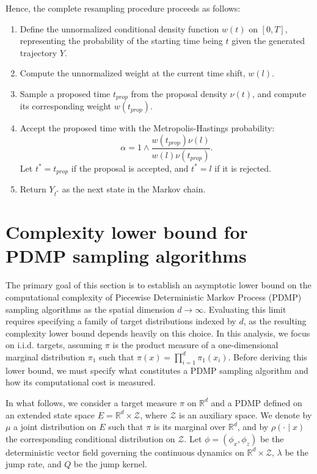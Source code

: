 \documentclass{article}
\begin{document}
Hence, the complete resampling procedure proceeds as follows:
\begin{enumerate}
    \item Define the unnormalized conditional density function $w(t)$ on $[0,T]$, representing the probability of the starting time being $t$ given the generated trajectory $Y$.
    \item Compute the unnormalized weight at the current time shift, $w(l)$.
    \item Sample a proposed time $t_{prop}$ from the proposal density $\nu(t)$, and compute its corresponding weight $w(t_{prop})$.
    \item Accept the proposed time with the Metropolis-Hastings probability:
    \begin{equation}
        \alpha = 1 \wedge \frac{w(t_{prop})\nu(l)}{w(l)\nu(t_{prop})}.
    \end{equation}
    Let $t^* = t_{prop}$ if the proposal is accepted, and $t^* = l$ if it is rejected.
    \item Return $Y_{t^*}$ as the next state in the Markov chain.
\end{enumerate}

\section{Complexity lower bound for PDMP sampling algorithms}
\label{sec:complexity_bound}
The primary goal of this section is to establish an asymptotic lower bound on the computational complexity of Piecewise Deterministic Markov Process (PDMP) sampling algorithms as the spatial dimension $d \rightarrow \infty$. Evaluating this limit requires specifying a family of target distributions indexed by $d$, as the resulting complexity lower bound depends heavily on this choice. In this analysis, we focus on i.i.d. targets, assuming $\pi$ is the product measure of a one-dimensional marginal distribution $\pi_1$ such that $\pi(x) = \prod_{i=1}^d \pi_1(x_i)$. Before deriving this lower bound, we must specify what constitutes a PDMP sampling algorithm and how its computational cost is measured.

In what follows, we consider a target measure $\pi$ on $\mathbb{R}^d$ and a PDMP defined on an extended state space $E = \mathbb{R}^d \times \mathcal{Z}$, where $\mathcal{Z}$ is an auxiliary space. We denote by $\mu$ a joint distribution on $E$ such that $\pi$ is its marginal over $\mathbb{R}^d$, and by $\rho(\cdot \mid x)$ the corresponding conditional distribution on $\mathcal{Z}$. Let $\phi = (\phi_x,\phi_z)$ be the deterministic vector field governing the continuous dynamics on $\mathbb{R}^d \times \mathcal{Z}$, $\lambda$ be the jump rate, and $Q$ be the jump kernel.
\end{document}
